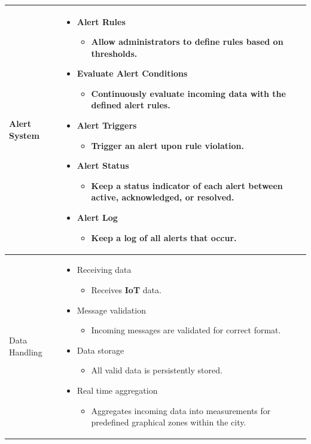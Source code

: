 \documentclass[]{article}
\begin{document}
\begin{longtable}{|p{3cm}|p{12cm}|}
Alert System &
\begin{itemize}
    \item Alert Rules
        \begin{itemize}
            \item Allow administrators to define rules based on thresholds.
        \end{itemize}
    \item Evaluate Alert Conditions
        \begin{itemize}
            \item Continuously evaluate incoming data with the defined alert rules.
        \end{itemize}
    \item Alert Triggers
        \begin{itemize}
            \item Trigger an alert upon rule violation.
        \end{itemize}
    \item Alert Status
        \begin{itemize}
            \item Keep a status indicator of each alert between active, acknowledged, or resolved.
        \end{itemize}
    \item Alert Log
        \begin{itemize}
            \item Keep a log of all alerts that occur.
        \end{itemize}
\end{itemize}
\\[5pt]
\hline

Data Handling & 
\begin{itemize}
    \item Receiving data
        \begin{itemize}
            \item Receives \textbf{IoT} data.
        \end{itemize}
    \item Message validation
        \begin{itemize}
            \item Incoming messages are validated for correct format.
        \end{itemize}
    \item Data storage
        \begin{itemize}
            \item All valid data is persistently stored.
        \end{itemize}
    \item Real time aggregation
        \begin{itemize}
            \item Aggregates incoming data into measurements for predefined graphical zones within the city.
        \end{itemize}
\end{itemize}
\\[5pt]
\hline


\end{longtable}
\end{document}
